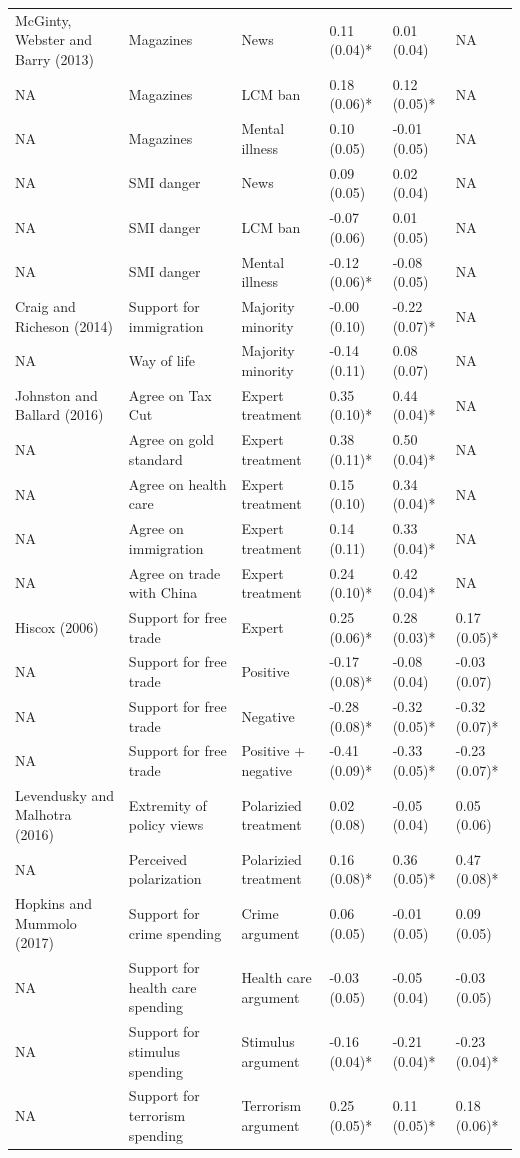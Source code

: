 \begin{table}[!h]
{\begin{tabular}[t]{llllll}
McGinty, Webster and Barry (2013) & Magazines & News & 0.11 (0.04)* & 0.01 (0.04) & NA\\
NA & Magazines & LCM ban & 0.18 (0.06)* & 0.12 (0.05)* & NA\\
NA & Magazines & Mental illness & 0.10 (0.05) & -0.01 (0.05) & NA\\
\addlinespace
NA & SMI danger & News & 0.09 (0.05) & 0.02 (0.04) & NA\\
NA & SMI danger & LCM ban & -0.07 (0.06) & 0.01 (0.05) & NA\\
NA & SMI danger & Mental illness & -0.12 (0.06)* & -0.08 (0.05) & NA\\
Craig and Richeson (2014) & Support for immigration & Majority minority & -0.00 (0.10) & -0.22 (0.07)* & NA\\
NA & Way of life & Majority minority & -0.14 (0.11) & 0.08 (0.07) & NA\\
\addlinespace
Johnston and Ballard (2016) & Agree on Tax Cut & Expert treatment & 0.35 (0.10)* & 0.44 (0.04)* & NA\\
NA & Agree on gold standard & Expert treatment & 0.38 (0.11)* & 0.50 (0.04)* & NA\\
NA & Agree on health care & Expert treatment & 0.15 (0.10) & 0.34 (0.04)* & NA\\
NA & Agree on immigration & Expert treatment & 0.14 (0.11) & 0.33 (0.04)* & NA\\
NA & Agree on trade with China & Expert treatment & 0.24 (0.10)* & 0.42 (0.04)* & NA\\
\addlinespace
Hiscox (2006) & Support for free trade & Expert & 0.25 (0.06)* & 0.28 (0.03)* & 0.17 (0.05)*\\
NA & Support for free trade & Positive & -0.17 (0.08)* & -0.08 (0.04) & -0.03 (0.07)\\
NA & Support for free trade & Negative & -0.28 (0.08)* & -0.32 (0.05)* & -0.32 (0.07)*\\
NA & Support for free trade & Positive + negative & -0.41 (0.09)* & -0.33 (0.05)* & -0.23 (0.07)*\\
Levendusky and Malhotra (2016) & Extremity of policy views & Polarizied treatment & 0.02 (0.08) & -0.05 (0.04) & 0.05 (0.06)\\
\addlinespace
NA & Perceived polarization & Polarizied treatment & 0.16 (0.08)* & 0.36 (0.05)* & 0.47 (0.08)*\\
Hopkins and Mummolo (2017) & Support for crime spending & Crime argument & 0.06 (0.05) & -0.01 (0.05) & 0.09 (0.05)\\
NA & Support for health care spending & Health care argument & -0.03 (0.05) & -0.05 (0.04) & -0.03 (0.05)\\
NA & Support for stimulus spending & Stimulus argument & -0.16 (0.04)* & -0.21 (0.04)* & -0.23 (0.04)*\\
NA & Support for terrorism spending & Terrorism argument & 0.25 (0.05)* & 0.11 (0.05)* & 0.18 (0.06)*\\
\bottomrule
\end{tabular}}
\end{table}
